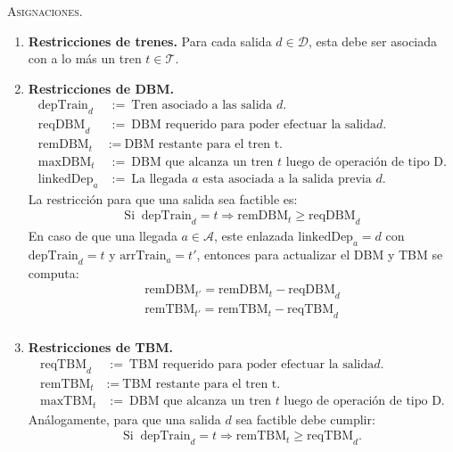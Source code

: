 \documentclass[letter, 10pt]{article}
\begin{document}
\begin{description}
    \item \textsc{Asignaciones.}
    \begin{enumerate}
        \item \textbf{Restricciones de trenes.} Para cada salida $d \in \mathcal{D}$, esta debe ser asociada con a lo más un tren $t \in \mathcal{T}$.
        \item \textbf{Restricciones de DBM.}
        \begin{align*}
            \text{depTrain}_d &:= \ \text{Tren asociado a las salida } d. \\
            \text{reqDBM}_d &:= \ \text{DBM requerido para poder efectuar la salida} d. \\
            \text{remDBM}_t &:= \ \text{DBM restante para el tren t.} \\
            \text{maxDBM}_t &:= \ \text{DBM que alcanza un tren } t \text{ luego de operación de tipo D}. \\
            \text{linkedDep}_a &:= \ \text{La llegada } a \text{ esta asociada a la salida previa } d.   
        \end{align*}
        La restricción para que una salida sea factible es:
        \begin{align*}
            \text{Si } \ \text{depTrain}_d = t \Rightarrow \text{remDBM}_t \geq \text{reqDBM}_d
        \end{align*}
        En caso de que una llegada $a \in \mathcal{A}$, este enlazada $\text{linkedDep}_a = d$ con $\text{depTrain}_d = t$ y $\text{arrTrain}_a = t'$, entonces para actualizar el DBM y TBM se computa:
        \begin{align*}
            \text{remDBM}_{t'} = \text{remDBM}_t - \text{reqDBM}_d \\
            \text{remTBM}_{t'} = \text{remTBM}_t - \text{reqTBM}_d \\
        \end{align*}

        \item \textbf{Restricciones de TBM.}
        \begin{align*}
            \text{reqTBM}_d &:= \ \text{TBM requerido para poder efectuar la salida} d. \\
            \text{remTBM}_t &:= \ \text{TBM restante para el tren t.} \\
            \text{maxTBM}_t &:= \ \text{DBM que alcanza un tren } t \text{ luego de operación de tipo D}.   
        \end{align*}
        Análogamente, para que una salida $d$ sea factible debe cumplir:
        \begin{align*}
            \text{Si } \ \text{depTrain}_d = t \Rightarrow \text{remTBM}_t \geq \text{reqTBM}_d.
        \end{align*}


\end{enumerate}
\end{description}
\end{document}
